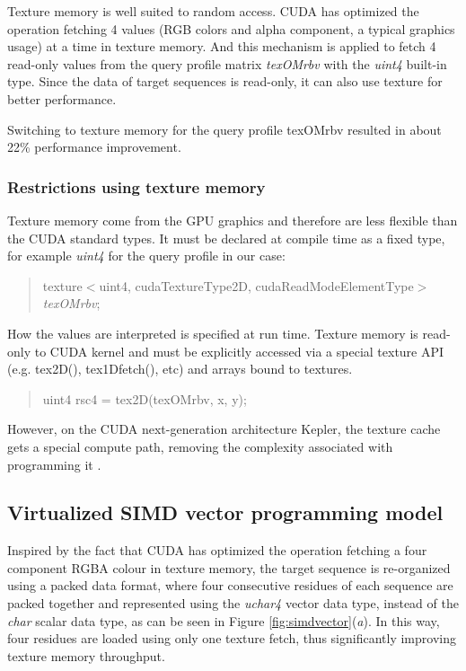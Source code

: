 Texture memory is well suited to random access. CUDA has optimized the operation fetching 4 values (RGB colors and alpha component, a typical graphics usage) at a time in texture memory. And this mechanism is applied to fetch 4 read-only values from the query profile matrix \emph{texOMrbv} with the \emph{uint4} built-in type. Since the data of target sequences is read-only, it can also use texture for better performance.

Switching to texture memory for the query profile texOMrbv resulted in about 22\% performance improvement.

\subsubsection*{Restrictions using texture memory}

Texture memory come from the GPU graphics and therefore are less flexible than the CUDA standard types. It must be declared at compile time as a fixed type, for example \emph{uint4} for the query profile in our case:

\begin{quote}
\selectfont
 texture$<$uint4, cudaTextureType2D, cudaReadModeElementType$>$ \emph{texOMrbv};
\end{quote}

How the values are interpreted is specified at run time. Texture memory is read-only to CUDA kernel and must be explicitly accessed via a special texture API (e.g. tex2D(), tex1Dfetch(), etc) and arrays bound to textures.

\begin{quote}
\selectfont
 uint4 rsc4 = tex2D(texOMrbv, x, y);
\end{quote}

However, on the CUDA next-generation architecture Kepler, the texture cache gets a special compute path, removing the complexity associated with programming it \citep{Kepler}.

\subsection{Virtualized SIMD vector programming model}

Inspired by the fact that CUDA has optimized the operation fetching a four component RGBA colour in texture memory, the target sequence is re-organized using a packed data format, where four consecutive residues of each sequence are packed together and represented using the \emph{uchar4} vector data type, instead of the \emph{char} scalar data type, as can be seen in Figure \ref{fig:simdvector}(\textit{a}). In this way, four residues are loaded using only one texture fetch, thus significantly improving texture memory throughput. 

